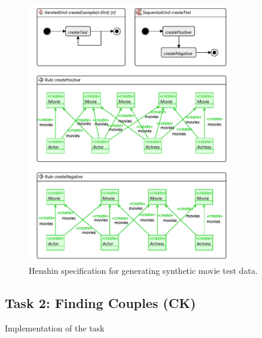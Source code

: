 \documentclass[a4paper]{article}
\begin{document}
\begin{figure}[p]
\centering
\includegraphics[width=0.8\textwidth]{gen-test-data}
\caption{Henshin specification for generating synthetic movie test data.}
\label{fig:gen-test-data}
\end{figure}

\subsection{Task 2: Finding Couples (CK)}

Implementation of the task
\end{document}
